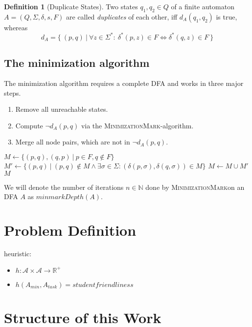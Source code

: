 \documentclass[a4paper, oneside, 11pt]{report}
\theoremstyle{definition}
\newtheorem{definition}{Definition}
\theoremstyle{remark}
\newcommand{\MinMark}{\textsc{MinimizationMark}}
\begin{document}
\begin{definition}[Duplicate States]
	Two states $q_1, q_2 \in Q$ of a finite automaton $A = (Q, \Sigma, \delta, s, F)$ are called \emph{duplicates} of each other, iff $d_A(q_1, q_2)$ is true, whereas
	\[
		d_A = \{\ (p, q)\ |\ \forall z \in \Sigma^* \colon\ \delta^*(p, z) \in F \Leftrightarrow \delta^*(q, z) \in F\ \}
	\]
\end{definition}

\subsection{The minimization algorithm}

The minimization algorithm requires a complete DFA and works in three major steps.
\begin{enumerate}
	\item Remove all unreachable states.
	\item Compute $\neg d_A(p, q)$ via the \MinMark-algorithm.
	\item Merge all node pairs, which are not in $\neg d_A(p, q)$.
\end{enumerate}

\begin{algorithmic}[1]
	\State $M \gets \{ (p,q), (q,p)\ |\ p \in F, q \notin F \}$
	\Do
		\State $M' \gets \{ (p,q)\ |\ (p,q) \notin M \land \exists \sigma \in \Sigma \colon (\delta(p,\sigma), \delta(q,\sigma)) \in M \}$
		\State $M \gets M \cup M'$
	\State \Return $M$
	\EndFunction
\end{algorithmic}
We will denote the number of iterations $n \in \mathbb{N}$ done by \MinMark on an DFA $A$ as $minmarkDepth(A)$.

\section{Problem Definition}

heuristic:
\begin{itemize}
	\item $h \colon \mathcal{A} \times \mathcal{A} \to \mathbb{R^+}$
	\item $h(A_{min}, A_{task}) = studentfriendliness$
\end{itemize}

\section{Structure of this Work}
\end{document}
